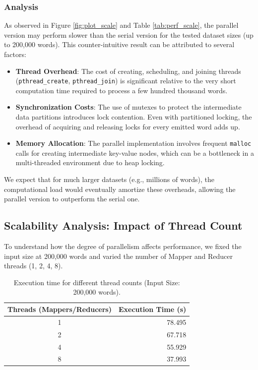 \documentclass[a4paper,12pt]{article}
\begin{document}
\subsubsection{Analysis}
As observed in Figure \ref{fig:plot_scale} and Table \ref{tab:perf_scale}, the parallel version may perform slower than the serial version for the tested dataset sizes (up to 200,000 words). This counter-intuitive result can be attributed to several factors:
\begin{itemize}
    \item \textbf{Thread Overhead}: The cost of creating, scheduling, and joining threads (\texttt{pthread\_create}, \texttt{pthread\_join}) is significant relative to the very short computation time required to process a few hundred thousand words.
    \item \textbf{Synchronization Costs}: The use of mutexes to protect the intermediate data partitions introduces lock contention. Even with partitioned locking, the overhead of acquiring and releasing locks for every emitted word adds up.
    \item \textbf{Memory Allocation}: The parallel implementation involves frequent \texttt{malloc} calls for creating intermediate key-value nodes, which can be a bottleneck in a multi-threaded environment due to heap locking.
\end{itemize}
We expect that for much larger datasets (e.g., millions of words), the computational load would eventually amortize these overheads, allowing the parallel version to outperform the serial one.

\subsection{Scalability Analysis: Impact of Thread Count}
To understand how the degree of parallelism affects performance, we fixed the input size at 200,000 words and varied the number of Mapper and Reducer threads (1, 2, 4, 8).

\begin{table}[H]
    \centering
    \begin{tabular}{cr}
        \toprule
        \textbf{Threads (Mappers/Reducers)} & \textbf{Execution Time (s)} \\
        \midrule
        1 & 78.495 \\
        2 & 67.718 \\
        4 & 55.929 \\
        8 & 37.993 \\
        \bottomrule
    \end{tabular}
    \caption{Execution time for different thread counts (Input Size: 200,000 words).}
    \label{tab:perf_threads}
\end{table}
\end{document}
